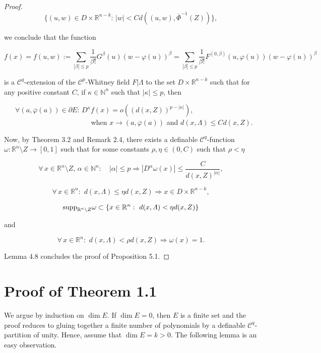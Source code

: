 \documentclass[12pt]{amsart}
\theoremstyle{definition}
\theoremstyle{remark}
\numberwithin{equation}{section}
\begin{document}
\begin{proof}
$$
\{(u, w)\in D\times \mathbb{R}^{n-k}: \, |w| < Cd((u, w), {\overline{\varPhi}}^{-1}(Z))\},
$$

we conclude that the function

$$
f(x) = f(u, w):= \sum_{|\beta|\leq p}\frac{1}{\beta!}G^{\beta}(u)(w - \varphi(u))^{\beta} = \sum_{|\beta|\leq p}\frac{1}{\beta!}F^{(0, \beta)}(u, \varphi(u))(w - \varphi(u))^{\beta}
$$

\medskip
\noindent
is a $\mathcal{C}^q$-extension of the $\mathcal{C}^p$-Whitney field $F|\varLambda$ to the set $D\times \mathbb{R}^{n-k}$ such that for any positive constant $C$, if $\kappa\in \mathbb{N}^n$ such that $|\kappa|\leq p$, then

$$
\forall (a,\overline{\varphi}(a))\in \partial E: \, D^{\kappa}f(x) = o((d(x, Z))^{p-|\kappa|}),\phantom{...........................}
$$
$\phantom{...........................................}$ when $x\rightarrow (a,\overline{\varphi}(a))$ and $d(x, \varLambda)\leq Cd(x, Z)$.

\bigskip
\noindent
Now, by Theorem 3.2 and Remark 2.4, there exists a definable $\mathcal{C}^q$-function $\omega: \mathbb{R}^n\setminus Z\longrightarrow [0, 1]$ such that for some constants $\rho, \eta\in (0, C)$ such that $\rho < \eta$

\medskip
$$
\forall \, x\in \mathbb{R}^n\setminus Z, \, \alpha\in \mathbb{N}^n: \quad |\alpha|\leq p \Longrightarrow |D^\alpha \omega(x)|\leq \frac{C}{d(x, Z)^{|\alpha|}},
$$

\medskip
$$
\forall \, x\in \mathbb{R}^n: \,\, d(x, \varLambda) \leq \eta d(x, Z) \Longrightarrow x\in D\times \mathbb{R}^{n-k},
$$

\medskip
$$
{\rm supp}_{{\mathbb{R}}^n\setminus Z}\omega\subset \{x\in {\mathbb{R}}^n: \,\, d(x, \varLambda) < \eta d(x, Z) \}
$$

and

$$
\forall \, x\in \mathbb{R}^n: \,\,  d(x, \varLambda) < \rho d(x, Z) \Longrightarrow \omega(x) = 1.
$$

\bigskip
Lemma 4.8 concludes the proof of Proposition 5.1.
\end{proof}

\bigskip
\section{Proof of Theorem 1.1}

\medskip
We argue by induction on $\dim E$. If $\dim E = 0$, then $E$ is a finite set and the proof reduces to gluing together a finite number of polynomials by a definable $\mathcal{C}^q$-partition of unity. Hence, assume that $\dim E = k >0$. The following lemma is an easy observation.
\end{document}
